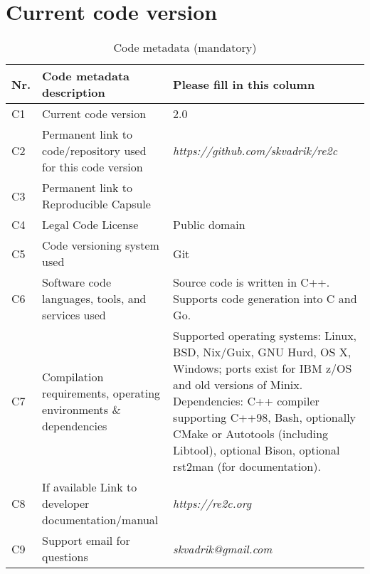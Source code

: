 \documentclass[preprint,12pt, a4paper]{elsarticle}
\begin{document}
\vfill\null
\clearpage

\section*{Current code version}
\label{}

\begin{table}[!h]
\begin{tabular}{|l|p{6.5cm}|p{6.5cm}|}
\hline
\textbf{Nr.} & \textbf{Code metadata description} & \textbf{Please fill in this column} \\
\hline
C1 & Current code version & 2.0 \\
\hline
C2 & Permanent link to code/repository used for this code version &
    \textit{https://github.com/skvadrik/re2c} \\
\hline
C3  & Permanent link to Reproducible Capsule & \\
\hline
C4 & Legal Code License   & Public domain \\
\hline
C5 & Code versioning system used & Git \\
\hline
C6 & Software code languages, tools, and services used &
    Source code is written in C++.
    Supports code generation into C and Go. \\
\hline
C7 & Compilation requirements, operating environments \& dependencies &
    Supported operating systems: Linux, BSD, Nix/Guix, GNU Hurd, OS X, Windows; ports exist for IBM z/OS and old versions of Minix.
    Dependencies: C++ compiler supporting C++98, Bash, optionally CMake or Autotools (including Libtool), optional Bison, optional rst2man (for documentation). \\
\hline
C8 & If available Link to developer documentation/manual & \textit{https://re2c.org} \\
\hline
C9 & Support email for questions & \textit{skvadrik@gmail.com} \\
\hline
\end{tabular}
\caption{Code metadata (mandatory)}
\label{} 
\end{table}
\end{document}
